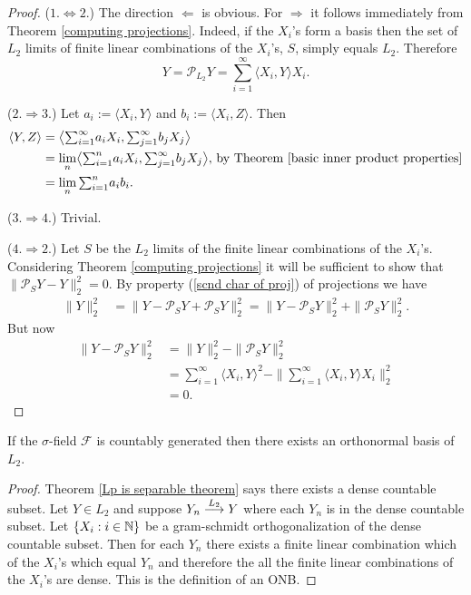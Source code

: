 \begin{proof}
($1.\Longleftrightarrow 2.$) The direction $\Leftarrow$ is obvious. For $\Rightarrow$ it follows immediately from Theorem \ref{computing projections}. Indeed, if the $X_i$'s form a basis then the set of $L_2$ limits of finite linear combinations of the $X_i$'s, $S$, simply equals $L_2$. Therefore
\[  
Y = \mathcal P_{L_2}Y = \sum_{i=1}^\infty \langle X_i, Y\rangle X_i.
\]

($2.\Longrightarrow 3.$) Let $a_i := \langle X_i, Y\rangle$ and $b_i := \langle X_i, Z\rangle$. Then
\begin{align*}
\langle Y, Z \rangle 
&=  \bigl\langle {\textstyle\sum_{i=1}^\infty} a_i X_i, {\textstyle\sum_{j=1}^\infty} b_j X_j \bigr\rangle \\
&= \lim_n \bigl\langle {\textstyle\sum_{i=1}^n} a_i X_i, {\textstyle\sum_{j=1}^\infty} b_j X_j \bigr\rangle,\,\text{by Theorem \ref{basic inner product properties}} \\
&= \lim_n {\textstyle\sum_{i=1}^{n}}   a_ib_i.
\end{align*} 



($3.\Longrightarrow 4.$) Trivial.

($4.\Longrightarrow 	2.$) Let $S$ be the $L_2$ limits of the finite linear combinations of the $X_i$'s. Considering Theorem \ref{computing projections} it will be sufficient to show that $\|\mathcal P_S Y - Y  \|_2^2 = 0$. By property (\ref{scnd char of proj}) of projections we have
\begin{align*} 
\| Y \|_2^2 & = \|Y-\mathcal P_S Y + \mathcal P_SY \|_2^2  =  \|Y-\mathcal P_S Y\|_2^2 + \|\mathcal P_SY \|_2^2.
\end{align*}
But now
\begin{align*}
\|Y-\mathcal P_S Y  \|_2^2& = \| Y \|_2^2 - \|\mathcal P_SY \|_2^2 \\
& = {\textstyle\sum_{i=1}^\infty \langle X_i, Y\rangle^2}  - \|\textstyle\sum_{i=1}^\infty \langle X_i, Y\rangle X_i \|_2^2 \\
& = 0.
\end{align*}
\end{proof}


\begin{theorem}
If the $\sigma$-field $\mathcal F$ is countably generated then there exists an orthonormal basis of $L_2$.
\end{theorem}
\begin{proof}
Theorem \ref{Lp is separable theorem}  says there exists a dense countable subset. Let $Y\in L_2$ and suppose $Y_n\overset{\small L_2} \longrightarrow Y$ where each $Y_n$ is in the dense countable subset. Let $\{X_i: i \in \Bbb N \}$ be a gram-schmidt orthogonalization of the dense countable subset. Then for each $Y_n$ there exists a finite linear combination which of the $X_i$'s which equal $Y_n$ and therefore the all the finite linear combinations of the $X_i$'s are dense. This is the definition of an ONB.
\end{proof}



